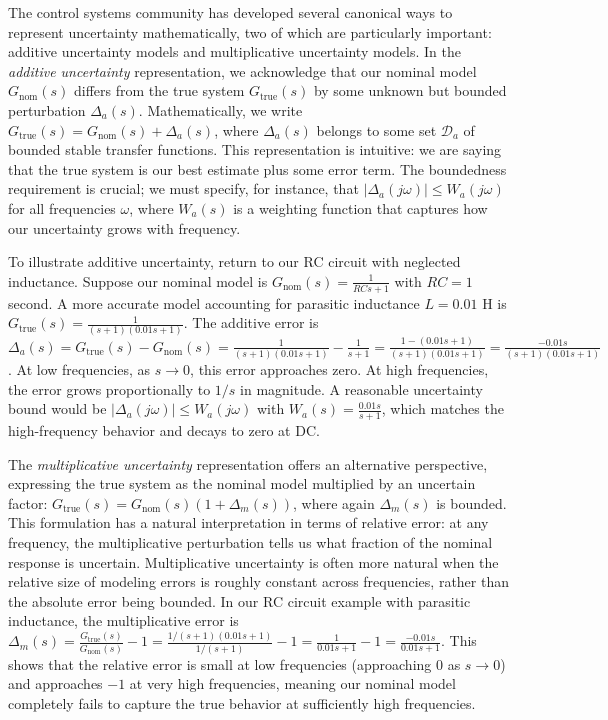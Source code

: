 The control systems community has developed several canonical ways to represent uncertainty mathematically, two of which are particularly important: additive uncertainty models and multiplicative uncertainty models. In the \emph{additive uncertainty} representation, we acknowledge that our nominal model $G_{\text{nom}}(s)$ differs from the true system $G_{\text{true}}(s)$ by some unknown but bounded perturbation $\Delta_a(s)$. Mathematically, we write $G_{\text{true}}(s) = G_{\text{nom}}(s) + \Delta_a(s)$, where $\Delta_a(s)$ belongs to some set $\mathcal{D}_a$ of bounded stable transfer functions. This representation is intuitive: we are saying that the true system is our best estimate plus some error term. The boundedness requirement is crucial; we must specify, for instance, that $|\Delta_a(j\omega)| \leq W_a(j\omega)$ for all frequencies $\omega$, where $W_a(s)$ is a weighting function that captures how our uncertainty grows with frequency.

To illustrate additive uncertainty, return to our RC circuit with neglected inductance. Suppose our nominal model is $G_{\text{nom}}(s) = \frac{1}{RCs + 1}$ with $RC = 1$ second. A more accurate model accounting for parasitic inductance $L = 0.01$ H is $G_{\text{true}}(s) = \frac{1}{(s+1)(0.01s+1)}$. The additive error is $\Delta_a(s) = G_{\text{true}}(s) - G_{\text{nom}}(s) = \frac{1}{(s+1)(0.01s+1)} - \frac{1}{s+1} = \frac{1 - (0.01s+1)}{(s+1)(0.01s+1)} = \frac{-0.01s}{(s+1)(0.01s+1)}$. At low frequencies, as $s \to 0$, this error approaches zero. At high frequencies, the error grows proportionally to $1/s$ in magnitude. A reasonable uncertainty bound would be $|\Delta_a(j\omega)| \leq W_a(j\omega)$ with $W_a(s) = \frac{0.01s}{s+1}$, which matches the high-frequency behavior and decays to zero at DC.

The \emph{multiplicative uncertainty} representation offers an alternative perspective, expressing the true system as the nominal model multiplied by an uncertain factor: $G_{\text{true}}(s) = G_{\text{nom}}(s)(1 + \Delta_m(s))$, where again $\Delta_m(s)$ is bounded. This formulation has a natural interpretation in terms of relative error: at any frequency, the multiplicative perturbation tells us what fraction of the nominal response is uncertain. Multiplicative uncertainty is often more natural when the relative size of modeling errors is roughly constant across frequencies, rather than the absolute error being bounded. In our RC circuit example with parasitic inductance, the multiplicative error is $\Delta_m(s) = \frac{G_{\text{true}}(s)}{G_{\text{nom}}(s)} - 1 = \frac{1/(s+1)(0.01s+1)}{1/(s+1)} - 1 = \frac{1}{0.01s+1} - 1 = \frac{-0.01s}{0.01s+1}$. This shows that the relative error is small at low frequencies (approaching 0 as $s \to 0$) and approaches $-1$ at very high frequencies, meaning our nominal model completely fails to capture the true behavior at sufficiently high frequencies.

